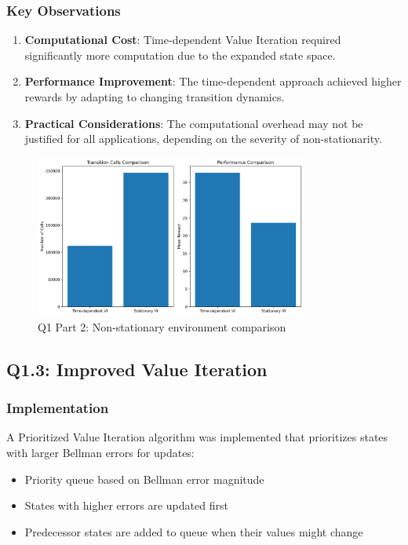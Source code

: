 \documentclass[12pt]{article}
\begin{document}
\subsubsection{Key Observations}

\begin{enumerate}
    \item \textbf{Computational Cost}: Time-dependent Value Iteration required significantly more computation due to the expanded state space.
    
    \item \textbf{Performance Improvement}: The time-dependent approach achieved higher rewards by adapting to changing transition dynamics.
    
    \item \textbf{Practical Considerations}: The computational overhead may not be justified for all applications, depending on the severity of non-stationarity.
\end{enumerate}

\begin{figure}[H]
\centering
\includegraphics[width=0.8\textwidth]{../Q1/part2/q1_part2_results.png}
\caption{Q1 Part 2: Non-stationary environment comparison}
\end{figure}

\clearpage
\subsection{Q1.3: Improved Value Iteration}

\subsubsection{Implementation}

A Prioritized Value Iteration algorithm was implemented that prioritizes states with larger Bellman errors for updates:
\begin{itemize}
    \item Priority queue based on Bellman error magnitude
    \item States with higher errors are updated first
    \item Predecessor states are added to queue when their values might change
\end{itemize}
\end{document}
